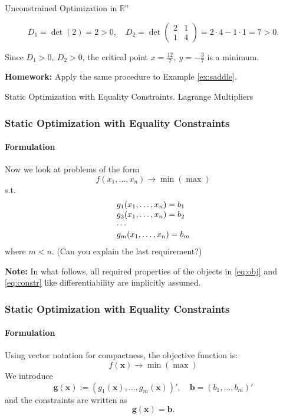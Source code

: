 \documentclass[10pt]{beamer}
\theoremstyle{definition}
\begin{document}
\begin{section}{Unconstrained Optimization in $ \mathbb{R}^n $}
\begin{frame}[fragile]
\begin{example}
\[ D_1 = \det (2) = 2>0, \quad D_2 = \det \begin{pmatrix}
2 & 1\\
1 & 4
\end{pmatrix} = 2 \cdot 4 - 1 \cdot 1 = 7 > 0. \]

Since $ D_1>0,~D_2>0 $, the critical point $ x=\frac{12}{7},~y=-\frac{3}{7} $ is a minimum.
\label{ex:locminR2cont}
\end{example}

\textbf{Homework:} Apply the same procedure to Example \ref{ex:saddle}.
\end{frame}
\end{section}


\begin{section}{Static Optimization with Equality Constraints. Lagrange Multipliers}\label{sec:Lagr}

\begin{frame}[fragile]
\frametitle{Static Optimization with Equality Constraints}
\framesubtitle{Formulation}
Now we look at problems of the form
\begin{equation}
f(x_1,\ldots,x_n)\rightarrow \min (\max)
\label{eq:obj}
\end{equation}
s.t.
\begin{equation}
\begin{array}{l l l}
g_1(x_1,\ldots,x_n) = b_1\\
g_2(x_1,\ldots,x_n) = b_2\\
\cdots \\
g_m(x_1,\ldots,x_n) = b_m\\
\end{array}
\label{eq:constr}
\end{equation}
where $ m<n $. (Can you explain the last requirement?) \bigskip

\textbf{Note:} In what follows, all required properties of the objects in \eqref{eq:obj} and \eqref{eq:constr} like differentiability are implicitly assumed.
\end{frame}

\begin{frame}[fragile]
\frametitle{Static Optimization with Equality Constraints}
\framesubtitle{Formulation}
Using vector notation for compactness, the objective function is:
\[ f(\mathbf{x}) \rightarrow \min (\max) \]
We introduce
\[ \mathbf{g}(\mathbf{x}):= (g_1(\mathbf{x}),\ldots,g_m(\mathbf{x}))',\quad \mathbf{b} = (b_1,\ldots,b_m)' \]
and the constraints are written as 
\[ \mathbf{g}(\mathbf{x})=\mathbf{b}. \]
\end{frame}


\end{section}
\end{document}
